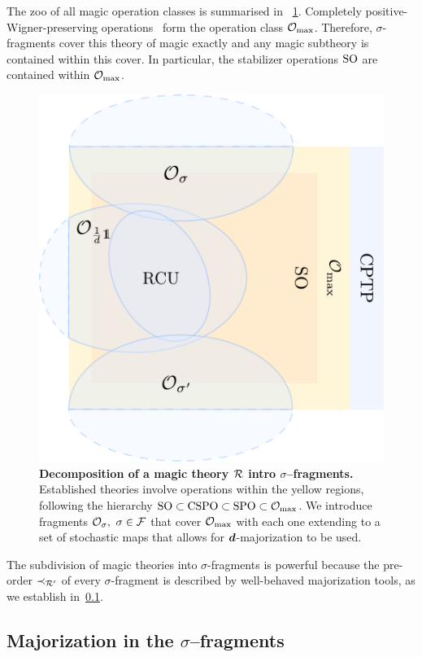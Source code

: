 \documentclass[pra,
aps,
twocolumn,
superscriptaddress,
groupedaddress,
nofootinbib,
reprint
]{revtex4-1}
\begin{document}
The zoo of all magic operation classes is summarised in ~\cref{fig:zoo}.
Completely positive-Wigner-preserving operations~\cite{cit:wang} form the operation class $\mathcal{O}_{\rm{}max}$.
Therefore, $\sigma$-fragments cover this theory of magic exactly and any magic subtheory is contained within this cover.
In particular, the stabilizer operations ${\rm{SO}}$ are contained within $\mathcal{O}_{\rm{}max}$.
\begin{figure}[t]
    \centering
        \includegraphics[scale=0.47
        ]{figs/operations.pdf}
    \caption{\textbf{Decomposition of a magic theory $\mathcal{R}$ intro $\sigma$--fragments.} 
    Established theories involve operations within the yellow regions, following the hierarchy ${\rm{SO}} \subset {\rm{CSPO}} \subset {\rm{SPO}} \subset \mathcal{O}_{\rm{}max}$.
    We introduce fragments $\mathcal{O}_\sigma,\ \sigma \in \mathcal{F}$ that cover $\mathcal{O}_{\rm{}max}$ with each one extending to a set of stochastic maps that allows for $\bm{d}$-majorization to be used.
    }
    \label{fig:zoo}
\end{figure}

The subdivision of magic theories into $\sigma$-fragments is powerful because the pre-order $\prec_{\mathcal{R}'}$ of every $\sigma$-fragment is described by well-behaved majorization tools, as we establish in~\cref{sec:major}. 

\subsection{Majorization in the $\sigma$--fragments}\label{sec:major}
\end{document}
